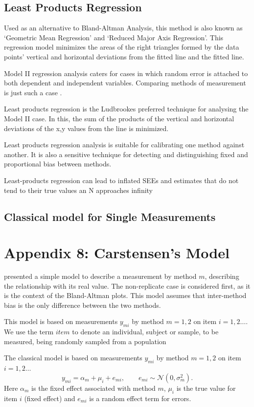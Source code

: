 \documentclass[12pt, a4paper]{report}
\theoremstyle{plain}
\theoremstyle{definition}
\theoremstyle{remark}
\begin{document}
\subsection{Least Products Regression}
Used as an alternative to Bland-Altman Analysis, this method is also known as `Geometric Mean Regression' and `Reduced Major Axis Regression'. This regression model minimizes the areas of the right triangles formed by the data points' vertical and horizontal deviations from the fitted line and the fitted line.
		
Model II regression analysis caters for cases in which random error is attached to both dependent and independent variables. Comparing methods of measurement is just such a case \citep{ludbrook97, ludbrook02}.
		
Least products regression is the Ludbrookes preferred technique for analysing the Model II case. In this, the sum of the products of the vertical and horizontal deviations of the x,y values from the line is minimized.
		
Least products regression analysis is suitable for calibrating one method against another. It is also a sensitive technique for detecting and distinguishing fixed and proportional bias between
		methods.
		
		Least-products regression can lead to inflated SEEs and estimates that do not tend to their true values an N approaches infinity \citep{draper1998}


\subsection{Classical model for Single Measurements}
\section{Appendix 8: Carstensen's Model}
\citet{BXC2004} presented a simple model to describe a measurement by method $m$, describing the relationship with its real value. The non-replicate case is considered first, as it is the context of the Bland-Altman plots. This model assumes that inter-method bias is the only difference between the two methods.

This model is based on measurements $y_{mi}$ by method $m=1,2$ on item $i = 1,2 \ldots$. We use the term $item$ to denote an individual, subject or sample, to be measured, being randomly sampled from a population

The classical model is based on measurements $y_{mi}$ by method $m=1,2$ on item $i = 1,2 \ldots$
\begin{equation}
y_{mi}  = \alpha_{m} + \mu_{i} + e_{mi}, \qquad  e_{mi} \sim
\mathcal{N}(0,\sigma^{2}_{m}).
\end{equation}
Here $\alpha_m$ is the fixed effect associated with method $m$,
$\mu_i$ is the true value for item $i$ (fixed effect) and $e_{mi}$ is a random effect term for errors.
\end{document}

